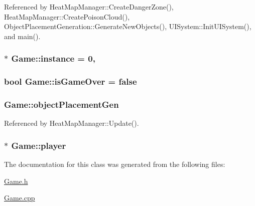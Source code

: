 Referenced by Heat\-Map\-Manager\-::\-Create\-Danger\-Zone(), Heat\-Map\-Manager\-::\-Create\-Poison\-Cloud(), Object\-Placement\-Generation\-::\-Generate\-New\-Objects(), U\-I\-System\-::\-Init\-U\-I\-System(), and main().

\hypertarget{class_game_aa469cdc0a30f4fd2d6d99b23f4fbf257}{
\subsubsection[{instance}]{ $\ast$ Game\-::instance = 0\hspace{0.3cm}{\ttfamily [static]}, {\ttfamily [private]}}}\label{class_game_aa469cdc0a30f4fd2d6d99b23f4fbf257}
\hypertarget{class_game_a80544462b0a02a5d30d238cbe7380492}{
\subsubsection[{is\-Game\-Over}]{\setlength{\rightskip}{0pt plus 5cm}bool Game\-::is\-Game\-Over = false\hspace{0.3cm}{\ttfamily [private]}}}\label{class_game_a80544462b0a02a5d30d238cbe7380492}
\hypertarget{class_game_a582b0adfa98534d79ec9511919827029}{
\subsubsection[{object\-Placement\-Gen}]{ Game\-::object\-Placement\-Gen}}\label{class_game_a582b0adfa98534d79ec9511919827029}


Referenced by Heat\-Map\-Manager\-::\-Update().

\hypertarget{class_game_abec70aa1c0269a9a7e171af4d79e08bf}{
\subsubsection[{player}]{$\ast$ Game\-::player\hspace{0.3cm}{\ttfamily [private]}}}\label{class_game_abec70aa1c0269a9a7e171af4d79e08bf}


The documentation for this class was generated from the following files\-:\begin{DoxyCompactItemize}
\item 
\hyperlink{_game_8h}{Game.\-h}\item 
\hyperlink{_game_8cpp}{Game.\-cpp}\end{DoxyCompactItemize}

